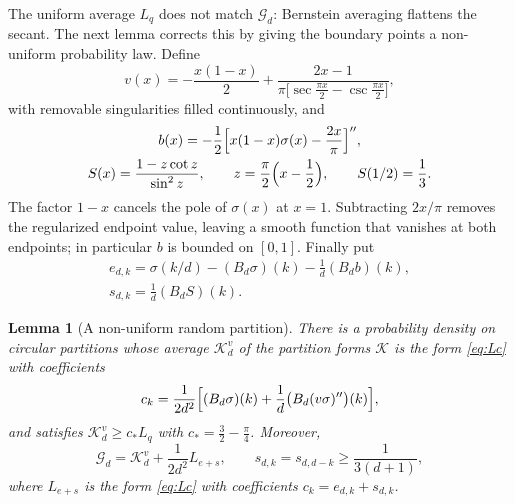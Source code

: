 \documentclass[aps,prl,reprint,superscriptaddress,longbibliography,floatfix,raggedbottom]{revtex4-2}
\newtheorem{lemma}{Lemma}
\newcommand{\cstar}{c_*}
\newcommand{\Gd}{\mathcal G_d}
\begin{document}
The uniform average $L_q$ does not match $\Gd$: Bernstein averaging
flattens the secant. The next lemma corrects this by giving the
boundary points a non-uniform probability law. Define
\begin{equation}\label{eq:vkernel}
v(x)=-\frac{x(1-x)}2
+\frac{2x-1}{\pi\bigl[\sec\frac{\pi x}2-\csc\frac{\pi x}2\bigr]},
\end{equation}
with removable singularities filled continuously, and
\[
\begin{gathered}
b(x)=-\frac12\Bigl[x(1-x)\sigma(x)-\frac{2x}\pi\Bigr]'',\\
S(x)=\frac{1-z\cot z}{\sin^2z},\qquad
z=\frac\pi2\Bigl(x-\frac12\Bigr),\qquad S(1/2)=\frac13 .
\end{gathered}
\]
The factor $1-x$ cancels the pole of $\sigma(x)$ at $x=1$.
Subtracting $2x/\pi$ removes the regularized endpoint value, leaving a
smooth function that vanishes at both endpoints; in particular $b$ is
bounded on $[0,1]$. Finally put
\begin{equation}\label{eq:es}
\begin{gathered}
e_{d,k}=\sigma(k/d)-(B_d\sigma)(k)-\frac1d(B_db)(k),\\
s_{d,k}=\frac1d(B_dS)(k).
\end{gathered}
\end{equation}

\begin{lemma}[A non-uniform random partition]\label{lem:tilted}
There is a probability density on circular partitions whose average
$\mathcal K_d^v$ of the partition forms $\mathcal K$ is the form
\eqref{eq:Lc} with coefficients
\begin{equation}\label{eq:Kv}
c_k=\frac1{2d^2}\Bigl[(B_d\sigma)(k)
+\frac1d\bigl(B_d(v\sigma)''\bigr)(k)\Bigr],
\end{equation}
and satisfies $\mathcal K_d^v\ge\cstar L_q$ with
$\cstar=\frac32-\frac\pi4$. Moreover,
\begin{equation}\label{eq:matching}
\Gd=\mathcal K_d^v+\frac1{2d^2}L_{e+s},
\qquad s_{d,k}=s_{d,d-k}\ge\frac1{3(d+1)} ,
\end{equation}
where $L_{e+s}$ is the form \eqref{eq:Lc} with coefficients
$c_k=e_{d,k}+s_{d,k}$.
\end{lemma}
\end{document}
